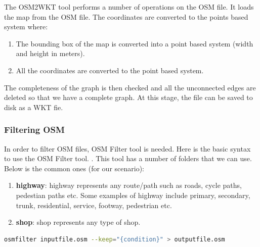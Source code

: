 \vspace{8mm}
The OSM2WKT tool \cite{mayer2010osm} performs a number of operations on the OSM file. It loads the map from the OSM file. The coordinates are converted to the points based system where:
   	 	\begin{enumerate}
	   	 	\item The bounding box of the map is converted into a point based system (width and height in meters).
   		 	\item All the coordinates are converted to the point based system.
   		 \end{enumerate}
   	 The completeness of the graph is then checked and all the unconnected edges are deleted so that we have a complete graph. At this stage, the file can be saved to disk as a WKT fie.

\subsubsection{Filtering OSM}
In order to filter OSM files, OSM Filter tool \cite{osm-filter} is needed. Here is the basic syntax to use the OSM Filter tool.  \cite{osm-filter}. This tool has a number of folders that we can use. Below is the common ones (for our scenario):

\begin{enumerate}
	\item  \textbf{highway}: highway represents any route/path such as roads, cycle paths, pedestian paths etc. Some examples of highway include primary, secondary, trunk, residential, service, footway, pedestrian etc.
	\item \textbf{shop}: shop represents any type of shop.

\end{enumerate}
\vspace{2mm}
\begin{lstlisting}[language=bash]
	osmfilter inputfile.osm --keep="{condition}" > outputfile.osm
\end{lstlisting}
\vspace{5mm}

